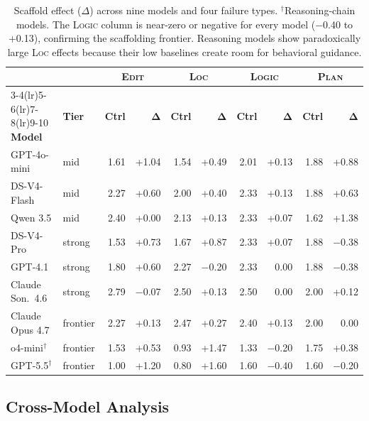 \documentclass[11pt]{article}
\begin{document}
\begin{table}[t]
\centering
\small
\begin{tabular}{@{}llrrrrrrrr@{}}
\toprule
& & \multicolumn{2}{c}{\textbf{\textsc{Edit}}} & \multicolumn{2}{c}{\textbf{\textsc{Loc}}} & \multicolumn{2}{c}{\textbf{\textsc{Logic}}} & \multicolumn{2}{c}{\textbf{\textsc{Plan}}} \\
\cmidrule(lr){3-4}\cmidrule(lr){5-6}\cmidrule(lr){7-8}\cmidrule(lr){9-10}
\textbf{Model} & \textbf{Tier} & \textbf{Ctrl} & $\boldsymbol{\Delta}$ & \textbf{Ctrl} & $\boldsymbol{\Delta}$ & \textbf{Ctrl} & $\boldsymbol{\Delta}$ & \textbf{Ctrl} & $\boldsymbol{\Delta}$ \\
\midrule
GPT-4o-mini & mid & 1.61 & +1.04 & 1.54 & +0.49 & 2.01 & +0.13 & 1.88 & +0.88 \\
DS-V4-Flash & mid & 2.27 & +0.60 & 2.00 & +0.40 & 2.33 & +0.13 & 1.88 & +0.63 \\
Qwen 3.5 & mid & 2.40 & +0.00 & 2.13 & +0.13 & 2.33 & +0.07 & 1.62 & +1.38 \\
\midrule
DS-V4-Pro & strong & 1.53 & +0.73 & 1.67 & +0.87 & 2.33 & +0.07 & 1.88 & $-$0.38 \\
GPT-4.1 & strong & 1.80 & +0.60 & 2.27 & $-$0.20 & 2.33 & 0.00 & 1.88 & $-$0.38 \\
Claude Son.\ 4.6 & strong & 2.79 & $-$0.07 & 2.50 & +0.13 & 2.50 & 0.00 & 2.00 & +0.12 \\
\midrule
Claude Opus 4.7 & frontier & 2.27 & +0.13 & 2.47 & +0.27 & 2.40 & +0.13 & 2.00 & 0.00 \\
o4-mini$^\dagger$ & frontier & 1.53 & +0.53 & 0.93 & +1.47 & 1.33 & $-$0.20 & 1.75 & +0.38 \\
GPT-5.5$^\dagger$ & frontier & 1.00 & +1.20 & 0.80 & +1.60 & 1.60 & $-$0.40 & 1.60 & $-$0.20 \\
\bottomrule
\end{tabular}
\caption{Scaffold effect ($\Delta$) across nine models and four failure types. $^\dagger$Reasoning-chain models. The \textsc{Logic} column is near-zero or negative for every model ($-$0.40 to +0.13), confirming the scaffolding frontier. Reasoning models show paradoxically large \textsc{Loc} effects because their low baselines create room for behavioral guidance.}
\label{tab:cross-model}
\end{table}

\subsection{Cross-Model Analysis}
\label{sec:cross-model}
\end{document}

